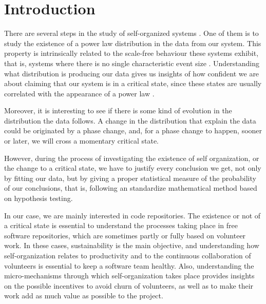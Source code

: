\documentclass{article}
\begin{document}


\section{Introduction}\label{introduction}

There are several steps in the study of self-organized systems
\cite{bak1988self}. One of them is to study the existence of a
power law distribution in the data from our system. This property is
intrinsically related to the scale-free behaviour these systems
exhibit, that is, systems where there is no single characteristic
event size \cite{golyk20self}.  Understanding what distribution is
producing our data gives us insights of how confident we are about
claiming that our system is in a critical state, since these states
are usually correlated with the appearance of a power law
\cite{newman2005power}.

Moreover, it is interesting to see if there is some kind of evolution
in the distribution the data follows.  A change in the distribution
that explain the data could be originated by a phase change, and, for
a phase change to happen, sooner or later, we will cross a momentary
critical
state. %

However, during the process of investigating the existence of self
organization, or the change to a critical state, we have to justify
every conclusion we get, not only by fitting our data, but by giving a
proper statistical measure of the probability of our conclusions, that
is, following an standardize mathematical method based on hypothesis
testing.

In our case, we are mainly interested in code repositories. The
existence or not of a critical state is essential to understand the
processes taking place in free software repositories, which are
sometimes partly or fully based on volunteer work. In these cases,
sustainability is the main objective, and understanding how
self-organization relates to productivity and to the continuous
collaboration of volunteers is essential to keep a software team
healthy. Also, understanding the micro-mechanisms through which
self-organization takes place provides insights on the possible
incentives to avoid churn of volunteers, as well as to make their work
add as much value as possible to the project.
\end{document}
